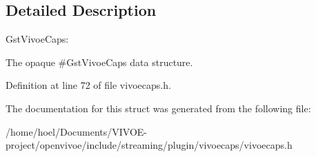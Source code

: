 \subsection{Detailed Description}
Gst\+Vivoe\+Caps\+:

The opaque \#\+Gst\+Vivoe\+Caps data structure. 

Definition at line 72 of file vivoecaps.\+h.



The documentation for this struct was generated from the following file\+:\begin{DoxyCompactItemize}
\item 
/home/hoel/\+Documents/\+V\+I\+V\+O\+E-\/project/openvivoe/include/streaming/plugin/vivoecaps/vivoecaps.\+h\end{DoxyCompactItemize}
